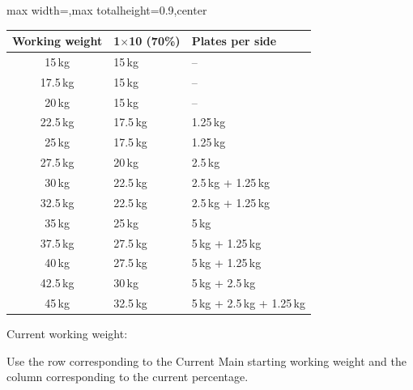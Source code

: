 \documentclass[11pt,a4paper]{article}
\newcommand{\tablearraystretch}{1.15}
\begin{document}
\begin{center}
\renewcommand{\arraystretch}{\tablearraystretch}
\begin{adjustbox}{max width=\linewidth,max totalheight=0.9\textheight,center}
\begin{tabular}{cll}
\toprule
Working weight & 1$\times$10 (70\%) & Plates per side \\
\midrule
15\,kg   & 15\,kg   & -- \\
17.5\,kg & 15\,kg   & -- \\
20\,kg   & 15\,kg   & -- \\
22.5\,kg & 17.5\,kg & 1.25\,kg \\
25\,kg   & 17.5\,kg & 1.25\,kg \\
27.5\,kg & 20\,kg   & 2.5\,kg \\
30\,kg   & 22.5\,kg & 2.5\,kg + 1.25\,kg \\
32.5\,kg & 22.5\,kg & 2.5\,kg + 1.25\,kg \\
35\,kg   & 25\,kg   & 5\,kg \\
37.5\,kg & 27.5\,kg & 5\,kg + 1.25\,kg \\
40\,kg   & 27.5\,kg & 5\,kg + 1.25\,kg \\
42.5\,kg & 30\,kg   & 5\,kg + 2.5\,kg \\
45\,kg   & 32.5\,kg & 5\,kg + 2.5\,kg + 1.25\,kg \\
\bottomrule
\end{tabular}
\end{adjustbox}
\renewcommand{\arraystretch}{1}
\end{center}

Current working weight:

Use the row corresponding to the Current Main starting working weight and the column corresponding to the current percentage.
\end{document}
